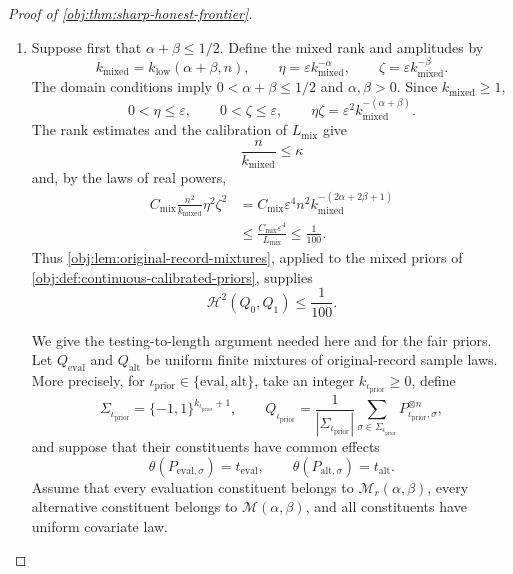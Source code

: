 \begin{proof}[Proof of \cref{obj:thm:sharp-honest-frontier}]
\begin{enumerate}
\item Suppose first that \(\alpha+\beta\le1/2\). Define the mixed rank and amplitudes by
\[
k_{\mathrm{mixed}}=k_{\mathrm{low}}(\alpha+\beta,n),
\qquad
\eta=\varepsilon k_{\mathrm{mixed}}^{-\alpha},
\qquad
\zeta=\varepsilon k_{\mathrm{mixed}}^{-\beta}.
\]
The domain conditions imply \(0<\alpha+\beta\le1/2\) and
\(\alpha,\beta>0\). Since \(k_{\mathrm{mixed}}\ge1\),
\[
0<\eta\le\varepsilon,\qquad 0<\zeta\le\varepsilon,
\qquad
\eta\zeta=\varepsilon^2k_{\mathrm{mixed}}^{-(\alpha+\beta)}.
\]
The rank estimates and the calibration of \(L_{\mathrm{mix}}\) give
\[
\frac{n}{k_{\mathrm{mixed}}}\le\kappa
\]
and, by the laws of real powers,
\[
\begin{aligned}
C_{\mathrm{mix}}\frac{n^2}{k_{\mathrm{mixed}}}\eta^2\zeta^2
&=
C_{\mathrm{mix}}\varepsilon^4
n^2k_{\mathrm{mixed}}^{-(2\alpha+2\beta+1)}\\
&\le
\frac{C_{\mathrm{mix}}\varepsilon^4}{L_{\mathrm{mix}}}
\le\frac1{100}.
\end{aligned}
\]
Thus \cref{obj:lem:original-record-mixtures}, applied to the mixed priors of
\cref{obj:def:continuous-calibrated-priors}, supplies
\[
\mathcal H^2(Q_0,Q_1)\le\frac1{100}.
\]

We give the testing-to-length argument needed here and for the fair priors.
Let \(Q_{\mathrm{eval}}\) and \(Q_{\mathrm{alt}}\) be uniform finite mixtures
of original-record sample laws. More precisely, for
\(\iota_{\mathrm{prior}}\in\{\mathrm{eval},\mathrm{alt}\}\), take an integer \(k_{\iota_{\mathrm{prior}}}\ge0\), define
\[
\Sigma_{\iota_{\mathrm{prior}}}=\{-1,1\}^{k_{\iota_{\mathrm{prior}}}+1},
\qquad
Q_{\iota_{\mathrm{prior}}}=\frac1{|\Sigma_{\iota_{\mathrm{prior}}}|}
\sum_{\sigma\in\Sigma_{\iota_{\mathrm{prior}}}}P_{\iota_{\mathrm{prior}},\sigma}^{\otimes n},
\]
and suppose that their constituents have common effects
\[
\theta(P_{\mathrm{eval},\sigma})=t_{\mathrm{eval}},
\qquad
\theta(P_{\mathrm{alt},\sigma})=t_{\mathrm{alt}}.
\]
Assume that every evaluation constituent belongs to
\(\mathcal M_r(\alpha,\beta)\), every alternative constituent belongs to
\(\mathcal M(\alpha,\beta)\), and all constituents have uniform covariate law.


\end{enumerate}
\end{proof}
